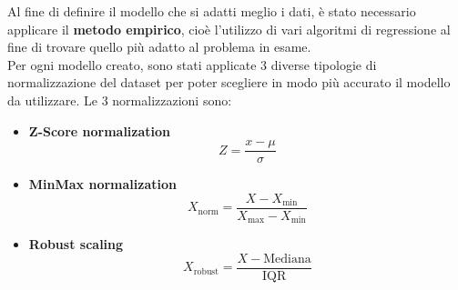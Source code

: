 Al fine di definire il modello che si adatti meglio i dati, è stato necessario applicare il \textbf{metodo empirico}, cioè l'utilizzo di vari algoritmi di regressione al fine di trovare quello più adatto al problema in esame.\\
Per ogni modello creato, sono stati applicate 3 diverse tipologie di normalizzazione del dataset per poter scegliere in modo più accurato il modello da utilizzare. Le 3 normalizzazioni sono:
\par{
\begin{itemize}
    \item \textbf{Z-Score normalization}\\
    \begin{equation}
        Z = \frac{x - \mu}{\sigma}
    \end{equation}
    \item \textbf{MinMax normalization}
    \begin{equation}
        X_{\text{norm}} = \frac{X - X_{\text{min}}}{X_{\text{max}} - X_{\text{min}}}
    \end{equation}
    \item \textbf{Robust scaling}
    \begin{equation}
        X_{\text{robust}} = \frac{X - \text{Mediana}}{\text{IQR}}
    \end{equation}
\end{itemize}
}\\

